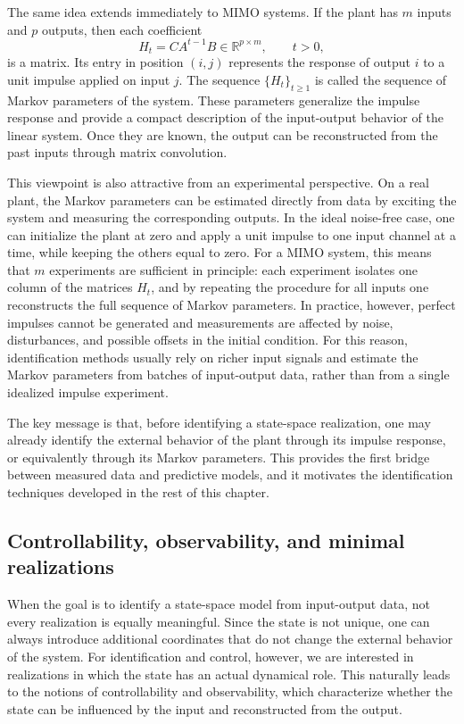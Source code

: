 The same idea extends immediately to MIMO systems. If the plant has \(m\) inputs and \(p\) outputs, then each coefficient
\[
H_t = CA^{t-1}B \in \mathbb{R}^{p\times m},\qquad t>0,
\]
is a matrix. Its entry in position \((i,j)\) represents the response of output \(i\) to a unit impulse applied on input \(j\). The sequence \(\{H_t\}_{t\geq 1}\) is called the sequence of Markov parameters of the system. These parameters generalize the impulse response and provide a compact description of the input-output behavior of the linear system. Once they are known, the output can be reconstructed from the past inputs through matrix convolution.

This viewpoint is also attractive from an experimental perspective. On a real plant, the Markov parameters can be estimated directly from data by exciting the system and measuring the corresponding outputs. In the ideal noise-free case, one can initialize the plant at zero and apply a unit impulse to one input channel at a time, while keeping the others equal to zero. For a MIMO system, this means that \(m\) experiments are sufficient in principle: each experiment isolates one column of the matrices \(H_t\), and by repeating the procedure for all inputs one reconstructs the full sequence of Markov parameters. In practice, however, perfect impulses cannot be generated and measurements are affected by noise, disturbances, and possible offsets in the initial condition. For this reason, identification methods usually rely on richer input signals and estimate the Markov parameters from batches of input-output data, rather than from a single idealized impulse experiment.

The key message is that, before identifying a state-space realization, one may already identify the external behavior of the plant through its impulse response, or equivalently through its Markov parameters. This provides the first bridge between measured data and predictive models, and it motivates the identification techniques developed in the rest of this chapter.

\subsection{Controllability, observability, and minimal realizations}

When the goal is to identify a state-space model from input-output data, not every realization is equally meaningful. Since the state is not unique, one can always introduce additional coordinates that do not change the external behavior of the system. For identification and control, however, we are interested in realizations in which the state has an actual dynamical role. This naturally leads to the notions of controllability and observability, which characterize whether the state can be influenced by the input and reconstructed from the output.

